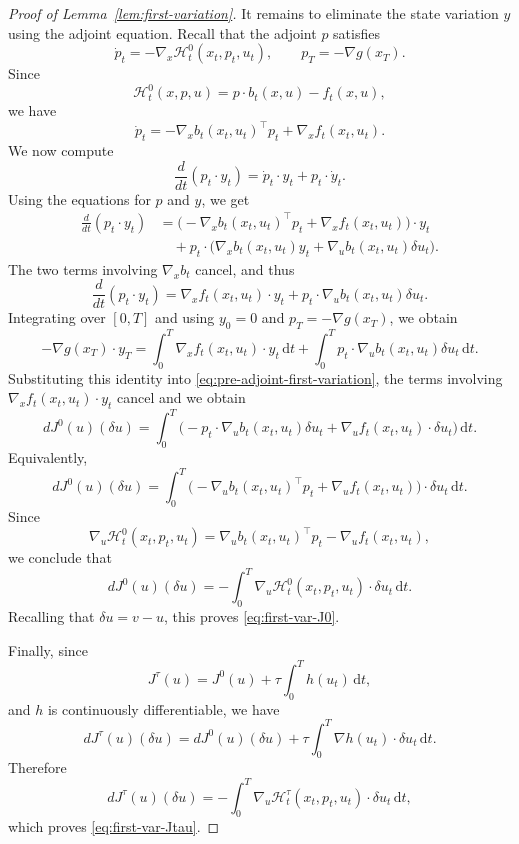 \documentclass[10pt,a4paper]{amsart}
\newcommand{\dd}{\,\mathrm{d}}
\begin{document}
\begin{proof}[Proof of Lemma~\ref{lem:first-variation}]
It remains to eliminate the state variation $y$ using the adjoint equation.
Recall that the adjoint $p$ satisfies
\[
\dot p_t
=
-\nabla_x \mathcal H_t^0(x_t,p_t,u_t),
\qquad
p_T= - \nabla g(x_T).
\]
Since
\[
\mathcal H_t^0(x,p,u)=p\cdot b_t(x,u) - f_t(x,u),
\]
we have
\[
\dot p_t
=
-\nabla_x b_t(x_t,u_t)^\top p_t + \nabla_x f_t(x_t,u_t).
\]
We now compute
\[
\frac{d}{dt}(p_t\cdot y_t)=\dot p_t\cdot y_t+p_t\cdot \dot y_t.
\]
Using the equations for $p$ and $y$, we get
\begin{align*}
\frac{d}{dt}(p_t\cdot y_t)
&=
\Big(-\nabla_x b_t(x_t,u_t)^\top p_t + \nabla_x f_t(x_t,u_t)\Big)\cdot y_t \\
&\quad
+
p_t\cdot
\Big(
\nabla_x b_t(x_t,u_t)y_t+\nabla_u b_t(x_t,u_t)\delta u_t
\Big).
\end{align*}
The two terms involving $\nabla_x b_t$ cancel, and thus
\[
\frac{d}{dt}(p_t\cdot y_t)
=
\nabla_x f_t(x_t,u_t)\cdot y_t
+
p_t\cdot \nabla_u b_t(x_t,u_t)\delta u_t.
\]
Integrating over $[0,T]$ and using $y_0=0$ and $p_T= - \nabla g(x_T)$, we obtain
\[
- \nabla g(x_T)\cdot y_T
=
\int_0^T \nabla_x f_t(x_t,u_t)\cdot y_t\dd t
+
\int_0^T p_t\cdot \nabla_u b_t(x_t,u_t)\delta u_t\dd t.
\]
Substituting this identity into \eqref{eq:pre-adjoint-first-variation}, the
terms involving $\nabla_x f_t(x_t,u_t)\cdot y_t$ cancel and we obtain
\[
dJ^0(u)(\delta u)
=
\int_0^T
\Big(
- p_t\cdot \nabla_u b_t(x_t,u_t)\delta u_t
+
\nabla_u f_t(x_t,u_t)\cdot \delta u_t
\Big)\dd t.
\]
Equivalently,
\[
dJ^0(u)(\delta u)
=
\int_0^T
\Big(
-\nabla_u b_t(x_t,u_t)^\top p_t+\nabla_u f_t(x_t,u_t)
\Big)\cdot \delta u_t\dd t.
\]
Since
\[
\nabla_u \mathcal H_t^0(x_t,p_t,u_t)
=
\nabla_u b_t(x_t,u_t)^\top p_t - \nabla_u f_t(x_t,u_t),
\]
we conclude that
\[
dJ^0(u)(\delta u)
=
- \int_0^T \nabla_u \mathcal H_t^0(x_t,p_t,u_t)\cdot \delta u_t\dd t.
\]
Recalling that $\delta u=v-u$, this proves \eqref{eq:first-var-J0}.

Finally, since
\[
J^\tau(u)=J^0(u)+\tau \int_0^T h(u_t)\dd t,
\]
and $h$ is continuously differentiable, we have
\[
dJ^\tau(u)(\delta u)
=
dJ^0(u)(\delta u)
+
\tau \int_0^T \nabla h(u_t)\cdot \delta u_t\dd t.
\]
Therefore
\[
dJ^\tau(u)(\delta u)
=
- \int_0^T \nabla_u \mathcal H_t^\tau(x_t,p_t,u_t)\cdot \delta u_t\dd t,
\]
which proves \eqref{eq:first-var-Jtau}.
\end{proof}
\end{document}

